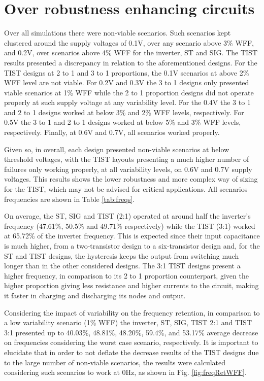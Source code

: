 \documentclass[pgmicro,mestrado,english]{iiufrgs}
\begin{document}
\section{Over robustness enhancing circuits}
 Over all simulations there were non-viable scenarios. Such scenarios kept clustered around the supply voltages of 0.1V, over any scenario above 3\% WFF, and 0.2V, over scenarios above 4\% WFF for the inverter, ST and SIG. The TIST results presented a discrepancy in relation to the aforementioned designs. For the TIST designs at 2 to 1 and 3 to 1 proportions, the 0.1V scenarios at above 2\% WFF level are not viable. For 0.2V and 0.3V the 3 to 1 designs only presented viable scenarios at 1\% WFF while the 2 to 1 proportion designs did not operate properly at such supply voltage at any variability level. For the 0.4V the 3 to 1 and 2 to 1 designs worked at below 3\% and 2\% WFF levels, respectively. For 0.5V the 3 to 1 and 2 to 1 designs worked at below 5\% and 3\% WFF levels, respectively. Finally, at 0.6V and 0.7V, all scenarios worked properly. 
 
 Given so, in overall, each design presented non-viable scenarios at below threshold voltages, with the TIST layouts presenting a much higher number of failures only working properly, at all variability levels, on 0.6V and 0.7V supply voltages. This results shows the lower robustness and more complex way of sizing for the TIST, which may not be advised for critical applications. All scenarios frequencies are shown in Table \ref{tab:freqs}.
 
 On average, the ST, SIG and TIST (2:1) operated at around half the inverter's frequency (47.61\%, 50.5\% and 49.71\% respectively) while the TIST (3:1) worked at 65.72\% of the inverter frequency. This is expected since their input capacitance is much higher, from a two-transistor design to a six-transistor design and, for the ST and TIST designs, the hysteresis keeps the output from switching much longer than in the other considered designs. The 3:1 TIST designs present a higher frequency, in comparison to its 2 to 1 proportion counterpart, given the higher proportion giving less resistance and higher currents to the circuit, making it faster in charging and discharging its nodes and output. 

Considering the impact of variability on the frequency retention, in comparison to a low variability scenario (1\% WFF) the inverter, ST, SIG, TIST 2:1 and TIST 3:1 presented up to 40.03\%, 48.81\%, 48.20\%, 59.4\%, and 53.17\% average decrease on frequencies considering the worst case scenario, respectively. It is important to elucidate that in order to not deflate the decrease results of the TIST designs due to the large number of non-viable scenarios, the results were calculated considering such scenarios to work at 0Hz, as shown in Fig. \ref{fig:freqRetWFF}.  
\end{document}
